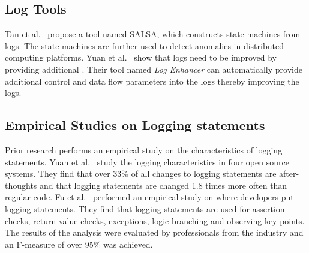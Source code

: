 %
%
\subsection {Log Tools}

Tan {et al}$ . $~\cite{TanSalsa} propose a tool named SALSA, which constructs state-machines from logs. The state-machines are further used to detect anomalies in distributed computing platforms. Yuan {et al$ . $}~\cite{Yuan} show that logs need to be improved by providing additional . Their tool named \emph{Log Enhancer} can automatically provide additional control and data flow parameters into the logs thereby improving the logs. 





\subsection{Empirical Studies on Logging statements}


Prior research performs an empirical study on the characteristics of logging statements. Yuan et al.~\cite{Characterizinglogs} study the logging characteristics in four open source systems. They find that over 33\% of all changes to logging statements are after-thoughts and that logging statements are changed 1.8 times more often than regular code. Fu {et al$.$}~\cite{Fu1} performed an empirical study on where developers put logging statements. They find that logging statements are used for assertion checks, return value checks, exceptions, logic-branching and observing key points. The results of the analysis were evaluated by professionals from the industry and an F-measure of over 95\% was achieved. 

